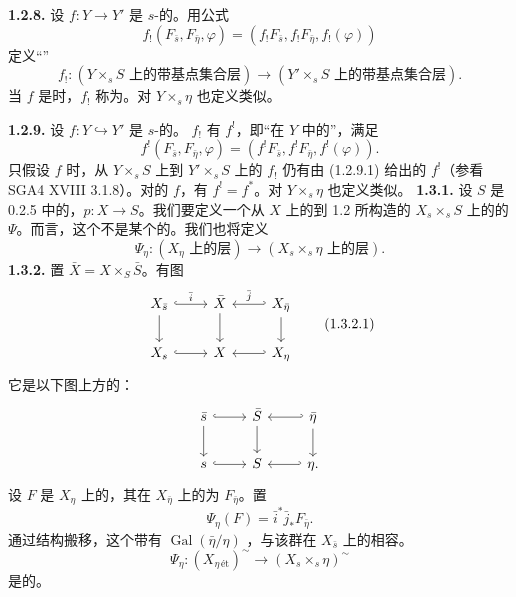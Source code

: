 \textbf{1.2.8.} 设 $f:Y\to Y'$ 是 $s$-的。用公式
\[f_!(F_{\bar s},F_{\bar\eta},\varphi)=(f_!F_{\bar s},f_!F_{\bar\eta},f_!(\varphi))\tag{1.2.8.1}\]
定义“”
\[f_!:(Y\times_sS\text{ 上的带基点集合层})\longrightarrow(Y'\times_sS\text{ 上的带基点集合层}).\]
当 $f$ 是时，$f_!$ 称为。对 $Y\times_s\eta$ 也定义类似。

\textbf{1.2.9.} 设 $f:Y\hookrightarrow Y'$ 是 $s$-的。 $f_!$ 有 $f^!$，即“在 $Y$ 中的”，满足
\[f^!(F_{\bar s},F_{\bar\eta},\varphi)=(f^!F_{\bar s},f^!F_{\bar\eta},f^!(\varphi)).\tag{1.2.9.1}\]
只假设 $f$ 时，从 $Y\times_sS$ 上到 $Y'\times_sS$ 上的 $f_!$ 仍有由 (1.2.9.1) 给出的 $f^!$（参看 SGA4 XVIII 3.1.8）。对的 $f$，有 $f^!=f^*$。对 $Y\times_s\eta$ 也定义类似。
\textbf{1.3.1.} 设 $S$ 是 0.2.5 中的，$p:X\to S$。我们要定义一个从 $X$ 上的到 1.2 所构造的 $X_s\times_sS$ 上的的 $\Psi$。而言，这个不是某个的。我们也将定义
\[\Psi_\eta:(X_\eta\text{ 上的层})\longrightarrow(X_s\times_s\eta\text{ 上的层}).\]
\textbf{1.3.2.} 置 $\bar X=X\times_S\bar S$。有图
\[
\begin{tikzcd}
X_{\bar s}\arrow[r,hook,"\bar i"]\arrow[d]&\bar X\arrow[d]&X_{\bar\eta}\arrow[l,hook',"\bar j"']\arrow[d]\\
X_s\arrow[r,hook]&X&X_\eta\arrow[l,hook']
\end{tikzcd}\tag{1.3.2.1}
\]
它是以下图上方的：
\[
\begin{tikzcd}
\bar s\arrow[r,hook]\arrow[d]&\bar S\arrow[d]&\bar\eta\arrow[l,hook']\arrow[d]\\
s\arrow[r,hook]&S&\eta\arrow[l,hook'].
\end{tikzcd}
\]
设 $F$ 是 $X_\eta$ 上的，其在 $X_{\bar\eta}$ 上的为 $F_{\bar\eta}$。置
\[\Psi_\eta(F)=\bar i^*\bar j_*F_{\bar\eta}.\tag{1.3.2.2}\]
通过结构搬移，这个带有 $\operatorname{Gal}(\bar\eta/\eta)$ ，与该群在 $X_{\bar s}$ 上的相容。
\[\Psi_\eta:(X_{\eta\,\text{ét}})^\sim\longrightarrow(X_s\times_s\eta)^\sim\tag{1.3.2.3}\]
是的。

